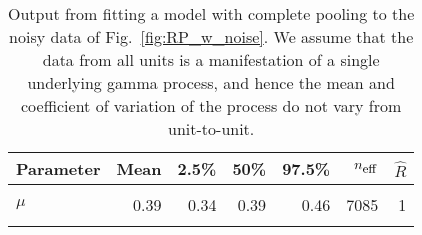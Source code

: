 \begin{table}
\centering
\caption{\label{tab:cp}Output from fitting a model with complete pooling to the noisy data of Fig.~\ref{fig:RP_w_noise}. We assume that the data from all units is a manifestation of a single underlying gamma process, and hence the mean and coefficient of variation of the process do not vary from unit-to-unit.}
\centering
\begin{tabular}[t]{lrrrrrr}
\toprule
Parameter & Mean & 2.5\% & 50\% & 97.5\% & $n_{\small{\mbox{eff}}}$ & $\hat{R}$\\
\midrule
\cellcolor{gray!10}{$\sigma$} & \cellcolor{gray!10}{0.03} & \cellcolor{gray!10}{0.02} & \cellcolor{gray!10}{0.03} & \cellcolor{gray!10}{0.04} & \cellcolor{gray!10}{2506} & \cellcolor{gray!10}{1}\\
$\mu$ & 0.39 & 0.34 & 0.39 & 0.46 & 7085 & 1\\
\cellcolor{gray!10}{$\nu$} & \cellcolor{gray!10}{0.21} & \cellcolor{gray!10}{0.15} & \cellcolor{gray!10}{0.21} & \cellcolor{gray!10}{0.30} & \cellcolor{gray!10}{673} & \cellcolor{gray!10}{1}\\
\bottomrule
\end{tabular}
\end{table}
